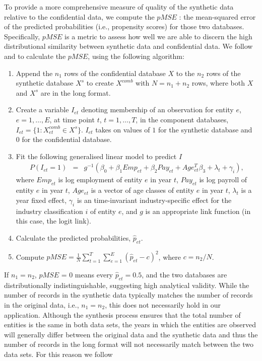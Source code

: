 \documentclass[10pt,twoside]{article}
\begin{document}
To provide a more comprehensive measure of  quality of the synthetic data relative to the confidential data, we compute the $pMSE$ \parencite[propensity score mean-squared error,][]{Woo_Reiter_Oganian_Karr_2009,SnokeSlavkovic2018,Snoke_RSSA2018}: the mean-squared error of the predicted probabilities (i.e., propensity scores) for those two databases. Specifically, $pMSE$ is a metric to assess how well we are able to discern the high distributional similarity between synthetic data and confidential data. We follow  \textcite{Woo_Reiter_Oganian_Karr_2009} and \textcite{SnokeSlavkovic2018} to calculate the $pMSE$, using the following algorithm:  
\begin{enumerate}
    \item Append the $n_1$ rows of the confidential database $X$ to the $n_2$ rows of the synthetic database $X^s$ to create $X^{comb}$ with $N=n_1 + n_2$ rows, where both $X$ and $X^s$ are in the long format.
    \item Create a variable $I_{et}$ denoting membership of an observation for entity $e$, $e=1,\ldots,E$, at time point $t$, $t=1,\ldots,T$, in the component databases,  $I_{et}=\{1: X^{comb}_{et} \in X^s\}$. $I_{et}$ takes on values of $1$ for the synthetic database and $0$ for the confidential database. 
    \item Fit the following generalised linear model to predict $I$
    \begin{eqnarray}	
        P(I_{et}=1) & = &g^{-1}(\beta_0 + \beta_{1} Emp_{et} + \beta_{2} Pay_{et} + Age_{et}^{T}\beta_{3} + \lambda_t + \gamma_i), \label{pMSE}
     \end{eqnarray}
         where $Emp_{et}$ is  log employment  of entity $e$ in year $t$, $Pay_{et}$ is  log payroll of entity $e$ in year $t$, $Age_{et}$ is a vector of age classes of entity $e$ in year $t$, $\lambda_t$ is a year fixed effect, $\gamma_i$ is an time-invariant industry-specific effect for the industry classification $i$ of entity $e$, and $g$ is an appropriate link function (in this case, the logit link).
\item Calculate the predicted probabilities, $\hat{p}_{et}$.
    \item Compute  $pMSE=\frac{1}{N}\sum_{t=1}^T\sum_{e=1}^E(\hat{p}_{et} - c)^2$, where $c=n_2/N$.
\end{enumerate}
If $n_1 = n_2$, $pMSE$ = 0 means every $\hat{p}_{et}= 0.5$, and the two databases are distributionally indistinguishable, suggesting  high analytical validity. While the number of records in the synthetic data typically matches the number of records in the original data, i.e., $n_1 = n_2$, this does not necessarily hold in our application. Although the synthesis process ensures that the total number of entities is the same in both data sets, the years in which the entities are observed will generally differ between the original data and the synthetic data and thus the number of records in the long format will not necessarily match between the two data sets. For this reason we follow 
\end{document}
